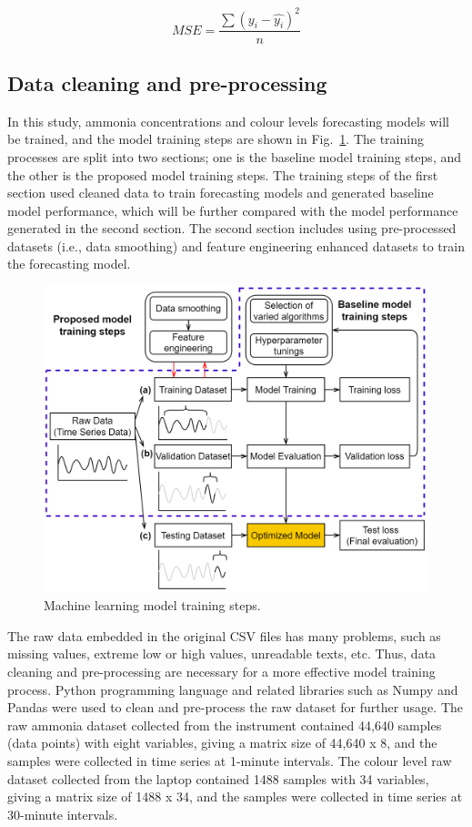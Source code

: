\begin{equation}\label{eq-mse}
    MSE=\frac{\sum (y_i-\hat{y_i})^2}{n}
\end{equation}

\subsection{Data cleaning and pre-processing}
In this study, ammonia concentrations and colour levels forecasting models will be trained, and the model training steps are shown in Fig.~\ref{fig:training-scheme}. The training processes are split into two sections; one is the baseline model training steps, and the other is the proposed model training steps. The training steps of the first section used cleaned data to train forecasting models and generated baseline model performance, which will be further compared with the model performance generated in the second section. The second section includes using pre-processed datasets (i.e., data smoothing) and feature engineering enhanced datasets to train the forecasting model. 

\begin{figure}[h]
    \centering
    \includegraphics[width=0.9\columnwidth]{imgs/pre-processing/training-scheme.png}
    \caption{Machine learning model training steps.}
    \label{fig:training-scheme}
\end{figure}

The raw data embedded in the original CSV files has many problems, such as missing values, extreme low or high values, unreadable texts, etc. Thus, data cleaning and pre-processing are necessary for a more effective model training process. Python programming language and related libraries such as Numpy and Pandas were used to clean and pre-process the raw dataset for further usage. The raw ammonia dataset collected from the instrument contained 44,640 samples (data points) with eight variables, giving a matrix size of 44,640 x 8, and the samples were collected in time series at 1-minute intervals. The colour level raw dataset collected from the laptop contained 1488 samples with 34 variables, giving a matrix size of 1488 x 34, and the samples were collected in time series at 30-minute intervals.

